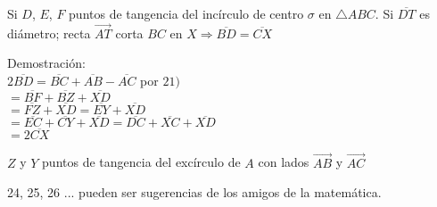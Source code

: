 \parbox[][][t]{.45\linewidth}{
 Si $D$, $E$, $F$ puntos de tangencia del incírculo de centro $\sigma$ en $\triangle ABC$. Si $\overline{DT}$ es diámetro; recta $\overrightarrow{AT}$ corta $BC$ en $X \Longrightarrow \overline{BD} = \overline{CX}$
 
 \vspace{0.4cm}
 
 Demostración:\vspace{0.1cm} \\$2 \overline{BD} = \overline{BC} + \overline{AB} - \overline{AC}$ por $21)$\\
 $= \overline{BF} + \overline{BZ} + \overline{XD}$\\
 $= \overline{FZ} + \overline{XD} = \overline{EY} + \overline{XD}$\\
 $= \overline{EC} + \overline{CY} + \overline{XD} = \overline{DC} + \overline{XC} + \overline{XD}$\\
 $= 2 \overline{CX}$
 
 \vspace{0.4cm}
 
 $Z$ y $Y$ puntos de tangencia del excírculo de $A$ con lados $\overrightarrow{AB}$ y $\overrightarrow{AC}$
}

\vspace{0.4cm}


\vspace{1cm}

24, 25, 26 ... pueden ser sugerencias de los amigos de la matemática.

